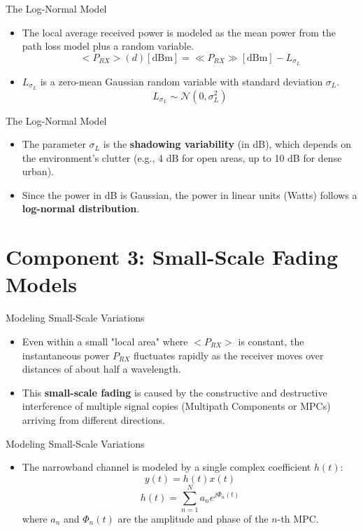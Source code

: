 \documentclass{beamer}
\begin{document}
	\begin{frame}{The Log-Normal Model}
		\begin{itemize}
			\item The local average received power is modeled as the mean power from the path loss model plus a random variable.
			\[ <P_{RX}>(d)[\text{dBm}] = \ll P_{RX} \gg[\text{dBm}] - L_{\sigma_L} \]
			\item $L_{\sigma_L}$ is a zero-mean Gaussian random variable with standard deviation $\sigma_L$.
			\[ L_{\sigma_L} \sim \mathcal{N}(0, \sigma_L^2) \]
		\end{itemize}
	\end{frame}
	
	\begin{frame}{The Log-Normal Model}
		\begin{itemize}
			\item The parameter $\sigma_L$ is the \textbf{shadowing variability} (in dB), which depends on the environment's clutter (e.g., 4 dB for open areas, up to 10 dB for dense urban).
			\item Since the power in dB is Gaussian, the power in linear units (Watts) follows a \textbf{log-normal distribution}.
		\end{itemize}
	\end{frame}
	
	\section{Component 3: Small-Scale Fading Models}
	
	\begin{frame}{Modeling Small-Scale Variations}
		\begin{itemize}
			\item Even within a small "local area" where $<P_{RX}>$ is constant, the instantaneous power $P_{RX}$ fluctuates rapidly as the receiver moves over distances of about half a wavelength.
			\item This \textbf{small-scale fading} is caused by the constructive and destructive interference of multiple signal copies (Multipath Components or MPCs) arriving from different directions.
		\end{itemize}
	\end{frame}
	
	\begin{frame}{Modeling Small-Scale Variations}
		\begin{itemize}
			\item The narrowband channel is modeled by a single complex coefficient $h(t)$:
			\[ y(t) = h(t) x(t) \]
			\[ h(t) = \sum_{n=1}^{N} a_n e^{j\Phi_n(t)} \]
			where $a_n$ and $\Phi_n(t)$ are the amplitude and phase of the $n$-th MPC.
		\end{itemize}
	\end{frame}
	
\end{document}
